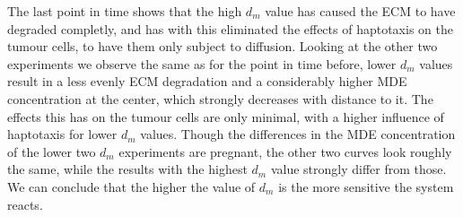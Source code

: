The last point in time shows that the high $d_m$ value has caused the ECM to have degraded completly, and has with this eliminated the effects of haptotaxis on the tumour cells, to have them only subject to diffusion. Looking at the other two experiments we observe the same as for the point in time before, lower $d_m$ values result in a less evenly ECM degradation and a considerably higher MDE concentration at the center, which strongly decreases with distance to it. The effects this has on the tumour cells are only minimal, with a higher influence of haptotaxis for lower $d_m$ values. \newline 
Though the differences in the MDE concentration of the lower two $d_m$ experiments are pregnant, the other two curves look roughly the same, while the results with the highest $d_m$ value strongly differ from those. We can conclude that the higher the value of $d_m$ is the more sensitive the system reacts.


